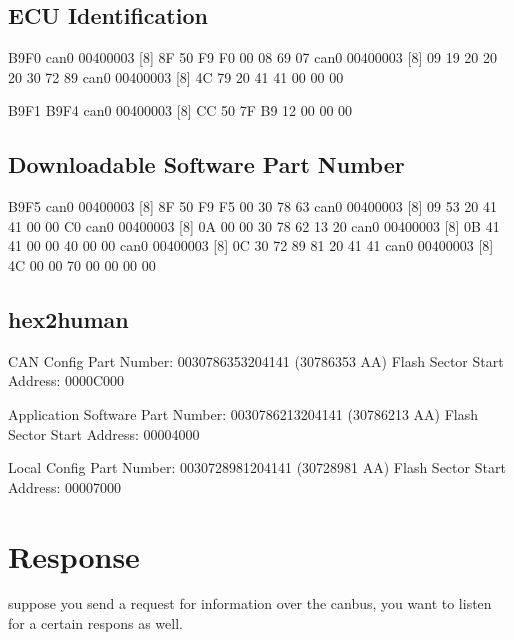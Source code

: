 \documentclass[letterpaper,10pt,english]{sphinxmanual}
\begin{document}
\subsection{ECU Identification}
\label{\detokenize{makingsense/partnumber:ecu-identification}}
\begin{sphinxVerbatim}[commandchars=\\\{\}]
B9F0
  can0  00400003   [8]  8F 50 F9 F0 00 08 69 07
  can0  00400003   [8]  09 19 20 20 20 30 72 89
  can0  00400003   [8]  4C 79 20 41 41 00 00 00

B9F1 \PYGZhy{} B9F4
  can0  00400003   [8]  CC 50 7F B9 12 00 00 00
\end{sphinxVerbatim}


\subsection{Downloadable Software Part Number}
\label{\detokenize{makingsense/partnumber:downloadable-software-part-number}}
\begin{sphinxVerbatim}[commandchars=\\\{\}]
B9F5
  can0  00400003   [8]  8F 50 F9 F5 00 30 78 63
  can0  00400003   [8]  09 53 20 41 41 00 00 C0
  can0  00400003   [8]  0A 00 00 30 78 62 13 20
  can0  00400003   [8]  0B 41 41 00 00 40 00 00
  can0  00400003   [8]  0C 30 72 89 81 20 41 41
  can0  00400003   [8]  4C 00 00 70 00 00 00 00
\end{sphinxVerbatim}


\subsection{hex2human}
\label{\detokenize{makingsense/partnumber:hex2human}}
\sphinxAtStartPar
CAN Config Part Number: 0030786353204141 (30786353 AA)
Flash Sector Start Address: 0000C000

\sphinxAtStartPar
Application Software Part Number: 0030786213204141 (30786213 AA)
Flash Sector Start Address: 00004000

\sphinxAtStartPar
Local Config Part Number: 0030728981204141 (30728981 AA)
Flash Sector Start Address: 00007000


\section{Response}
\label{\detokenize{makingsense/respons:response}}\label{\detokenize{makingsense/respons::doc}}
\sphinxAtStartPar
suppose you send a request for information over the canbus, you want to listen for a certain respons as well.
\end{document}
